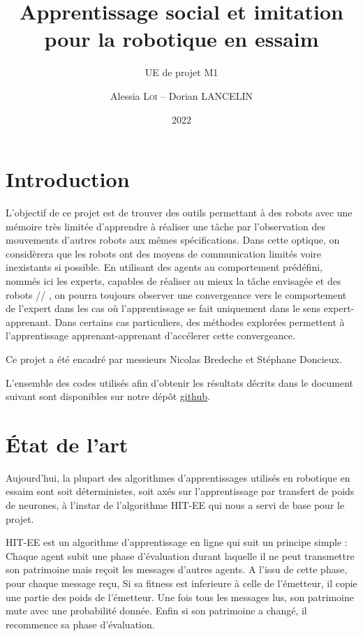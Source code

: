 \documentclass[a4paper, 12pt]{report}
\institute{Sorbonne Université}
\title{Apprentissage social et imitation pour la robotique en essaim}
\subtitle{UE de projet M1}
\author{Alessia \textsc{Loi} -- Dorian \textsc{LANCELIN}}
\date{2022}
\begin{document}
    \maketitle
    \romantableofcontents

    \chapter{Introduction}
	L'objectif de ce projet est de trouver des outils permettant à des robots avec une mémoire très limitée d'apprendre à réaliser une tâche par l'observation des mouvements d'autres robots aux mêmes spécifications.
Dans cette optique, on considèrera que les robots ont des moyens de communication limités voire inexistants si possible.
En utilisant des agents au comportement prédéfini, nommés ici les experts, capables de réaliser au mieux la tâche envisagée et des robots // , on pourra toujours observer une convergeance vers le comportement de l'expert dans les cas où l'apprentissage se fait uniquement dans le sens expert-apprenant.
    Dans certains cas particuliers, des méthodes explorées permettent à l'apprentissage apprenant-apprenant d'accélerer cette convergeance. 
    
    Ce projet a été encadré par messieurs Nicolas Bredeche et Stéphane Doncieux.  
    
    L'ensemble des codes utilisés afin d'obtenir les résultats décrits dans le document suivant sont disponibles sur notre dépôt \href{https://github.com/aerrynn/M1_Projet_ASIRE}{github}. 

    \chapter{État de l'art}
    Aujourd'hui, la plupart des algorithmes d'apprentissages utilisés en robotique en essaim sont soit déterministes, soit axés sur l'apprentissage par transfert de poids de neurones, à l'instar de l'algorithme HIT-EE qui nous a servi de base pour le projet.
    
    HIT-EE est un algorithme d'apprentissage en ligne qui suit un principe simple : Chaque agent subit une phase d'évaluation durant laquelle il ne peut transmettre son patrimoine mais reçoit les messages d'autres agents. A l'issu de cette phase, pour chaque message reçu, Si sa fitness est inferieure à celle de l'émetteur, il copie une partie des poids de l'émetteur. Une fois tous les messages lus, son patrimoine mute avec une probabilité donnée. Enfin si son patrimoine a changé, il recommence sa phase d'évaluation.
    
\end{document}
